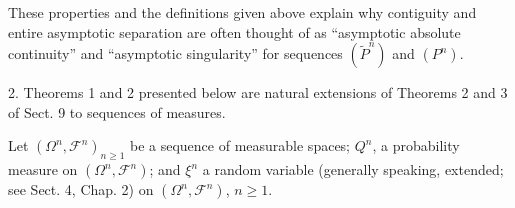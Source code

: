 These properties and the definitions given above explain why contiguity and entire asymptotic separation are often thought of as “asymptotic absolute continuity” and “asymptotic singularity” for sequences $(\tilde{P}^n)$ and $(P^n)$.

2. Theorems 1 and 2 presented below are natural extensions of Theorems 2 and 3 of Sect. 9 to sequences of measures.

Let $(\Omega^n, \mathcal{F}^n)_{n \geq 1}$ be a sequence of measurable spaces; $Q^n$, a probability measure on $(\Omega^n, \mathcal{F}^n)$; and $\xi^n$ a random variable (generally speaking, extended; see Sect. 4, Chap. 2) on $(\Omega^n, \mathcal{F}^n)$, $n \geq 1$.
